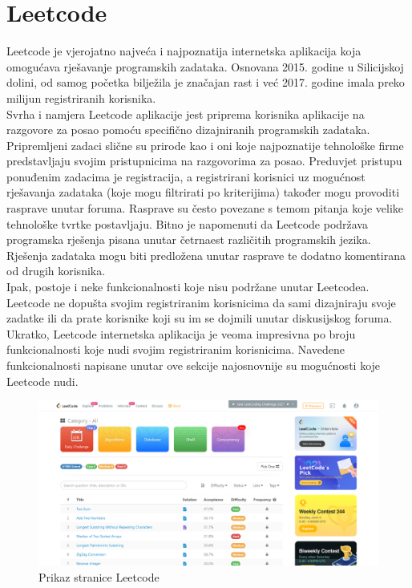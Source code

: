 \documentclass[times, utf8, zavrsni, numeric]{fer}
\begin{document}
		\section{Leetcode}
		Leetcode je vjerojatno najveća i najpoznatija internetska aplikacija koja omogućava rješavanje programskih zadataka. Osnovana 2015. godine u Silicijskoj dolini, od samog početka bilježila je značajan rast i već 2017. godine imala preko milijun registriranih korisnika.\\
		Svrha i namjera Leetcode aplikacije jest priprema korisnika aplikacije na razgovore za posao pomoću specifično dizajniranih programskih zadataka. Pripremljeni zadaci slične su prirode kao i oni koje najpoznatije tehnološke firme predstavljaju svojim pristupnicima na razgovorima za posao. Preduvjet pristupu ponuđenim zadacima je registracija, a registrirani korisnici uz mogućnost rješavanja zadataka (koje mogu filtrirati po kriterijima) također mogu provoditi rasprave unutar foruma. Rasprave su često povezane s temom pitanja koje velike tehnološke tvrtke postavljaju. Bitno je napomenuti da Leetcode podržava programska rješenja pisana unutar četrnaest različitih programskih jezika. Rješenja zadataka mogu biti predložena unutar rasprave te dodatno komentirana od drugih korisnika.\\
		Ipak, postoje i neke funkcionalnosti koje nisu podržane unutar Leetcodea. Leetcode ne dopušta svojim registriranim korisnicima da sami dizajniraju svoje zadatke ili da prate korisnike koji su im se dojmili unutar diskusijskog foruma.\\
		Ukratko, Leetcode internetska aplikacija je veoma impresivna po broju funkcionalnosti koje nudi svojim registriranim korisnicima. Navedene funkcionalnosti napisane unutar ove sekcije najosnovnije su mogućnosti koje Leetcode nudi.
		\begin{figure}[H]
			\centering
			\includegraphics[width=\linewidth]{pictures/prikazi/Leetcode.png}
			\caption{Prikaz stranice Leetcode}
			\label{fig:leetcode}
		\end{figure}
	
\end{document}
